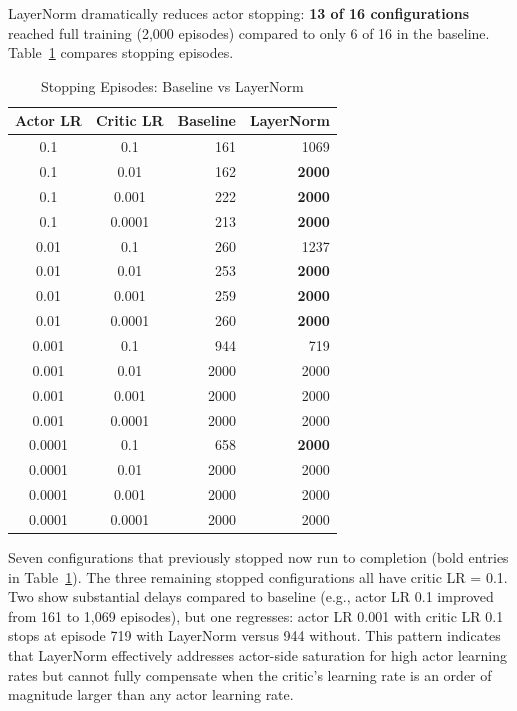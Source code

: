LayerNorm dramatically reduces actor stopping: \textbf{13 of 16 configurations} reached full training (2,000 episodes) compared to only 6 of 16 in the baseline. Table~\ref{tab:layernorm_stopping} compares stopping episodes.

\begin{table}[htbp]
\caption{Stopping Episodes: Baseline vs LayerNorm}
\label{tab:layernorm_stopping}
\centering
\small
\begin{tabular}{ccrr}
\toprule
\textbf{Actor LR} & \textbf{Critic LR} & \textbf{Baseline} & \textbf{LayerNorm} \\
\midrule
0.1 & 0.1 & 161 & 1069 \\
0.1 & 0.01 & 162 & \textbf{2000} \\
0.1 & 0.001 & 222 & \textbf{2000} \\
0.1 & 0.0001 & 213 & \textbf{2000} \\
0.01 & 0.1 & 260 & 1237 \\
0.01 & 0.01 & 253 & \textbf{2000} \\
0.01 & 0.001 & 259 & \textbf{2000} \\
0.01 & 0.0001 & 260 & \textbf{2000} \\
0.001 & 0.1 & 944 & 719 \\
0.001 & 0.01 & 2000 & 2000 \\
0.001 & 0.001 & 2000 & 2000 \\
0.001 & 0.0001 & 2000 & 2000 \\
0.0001 & 0.1 & 658 & \textbf{2000} \\
0.0001 & 0.01 & 2000 & 2000 \\
0.0001 & 0.001 & 2000 & 2000 \\
0.0001 & 0.0001 & 2000 & 2000 \\
\bottomrule
\end{tabular}
\end{table}

Seven configurations that previously stopped now run to completion (bold entries in Table~\ref{tab:layernorm_stopping}). The three remaining stopped configurations all have critic LR = 0.1. Two show substantial delays compared to baseline (e.g., actor LR 0.1 improved from 161 to 1,069 episodes), but one regresses: actor LR 0.001 with critic LR 0.1 stops at episode 719 with LayerNorm versus 944 without. This pattern indicates that LayerNorm effectively addresses actor-side saturation for high actor learning rates but cannot fully compensate when the critic's learning rate is an order of magnitude larger than any actor learning rate.

